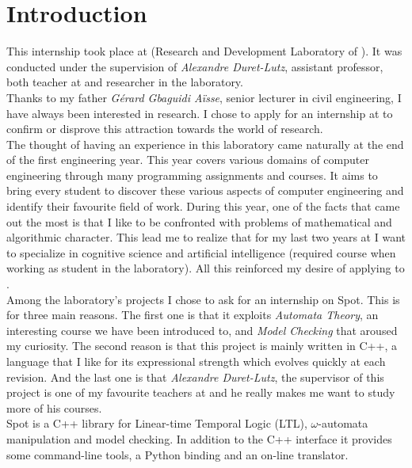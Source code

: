 \chapter{Introduction}

This internship took place at \LRDE\space (Research and Development Laboratory of \EPITA). It was conducted
under the supervision of \textit{Alexandre Duret-Lutz}, assistant professor, both teacher at \EPITA\space
and researcher in the laboratory.\\

Thanks to my father \textit{Gérard Gbaguidi Aïsse}, senior lecturer in civil engineering, I have always
been interested in research. I chose to apply for an internship at \LRDE\space to confirm or disprove this
attraction towards the world of research.\\

The thought of having an experience in this laboratory came naturally at the end of the first
engineering year. This year covers various domains of computer engineering through many programming
assignments and courses. It aims to bring every student to
discover these various aspects of computer engineering and identify their favourite field of work. During
this year, one of the facts that came out the most is that I like to be confronted with problems of
mathematical and algorithmic character. This lead me to realize that for my last two years at \EPITA\space
I want to specialize in cognitive science and artificial intelligence (required course when working as
student in the laboratory). All this reinforced my desire of applying to \LRDE.\\

Among the laboratory's projects I chose to ask for an internship on Spot. This is for three
main reasons. The first one is that it exploits \textit{Automata Theory}, an interesting course we
have been introduced to, and \textit{Model Checking} that aroused my curiosity. The
second reason is that this project is mainly written in C++, a language that I like for its
expressional strength which evolves quickly at each revision. And the last one is that
\textit{Alexandre Duret-Lutz}, the supervisor of this project is one of my favourite teachers  at \EPITA\space
and he really makes me want to study more of his courses.\\

Spot is a C++ library for Linear-time Temporal Logic (LTL), $\omega$-automata manipulation and model
checking. In addition to the C++ interface it provides some command-line tools, a Python binding and an
on-line translator.\\

